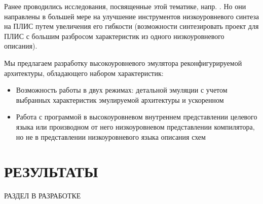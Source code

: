\documentclass[utf8]{psta}%
\begin{document}
Ранее проводились исследования, посвященные этой тематике, напр. \cite{Takamaeda-Yamazaki2014}. Но они направлены в большей мере на улучшение инструментов низкоуровневого синтеза на ПЛИС путем увеличения его гибкости (возможности синтезировать проект для ПЛИС с большим разбросом характеристик из одного низкоуровневого описания).

Мы предлагаем разработку высокоуровневого эмулятора реконфигурируемой архитектуры, обладающего набором характеристик:

\begin{itemize}
    \item Возможность работы в двух режимах: детальной эмуляции с учетом выбранных характеристик эмулируемой архитектуры и ускоренном
    \item Работа с программой в высокоуровневом внутреннем представлении целевого языка или производном от него низкоуровневом представлении компилятора, но не в представлении низкоуровневого языка описания схем
    
\end{itemize}
  
  
\section{РЕЗУЛЬТАТЫ}

РАЗДЕЛ В РАЗРАБОТКЕ
   

\section{}
\subsection{}


% 


\end{document}
